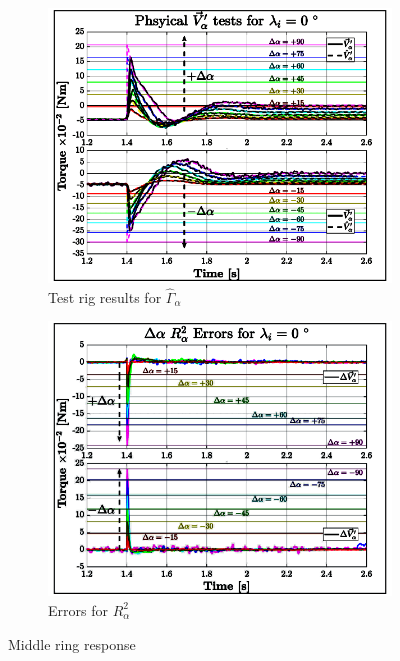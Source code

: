 \begin{figure}[htbp]
\centering
\begin{subfigure}{0.49\textwidth}
\centering
\includegraphics[width=\textwidth]{graphs/tau-alpha}
\caption{Test rig results for $\hat{\Gamma}_\alpha$}
\label{fig:tau-alpha}
\end{subfigure}
\begin{subfigure}{0.49\textwidth}
\centering
\includegraphics[width=\textwidth]{graphs/tau-alpha-r}
\caption{Errors for $R^2_{\alpha}$}
\label{fig:tau-alpha-r}
\end{subfigure}
\vspace{-8pt}
\caption{Middle ring response}
\label{fig:middle-response-test}
\vspace{-16pt}
\end{figure}
